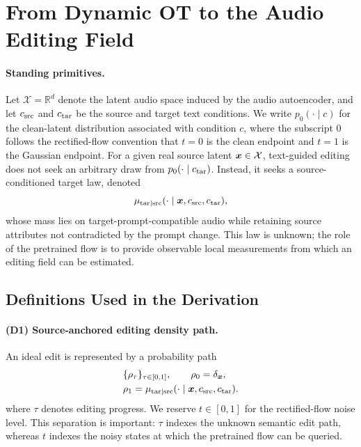 \section{From Dynamic OT to the Audio Editing Field}
\label{app:dynamic_ot_audio}

\paragraph{Standing primitives.}
Let $\mathcal{X}=\mathbb{R}^{d}$ denote the latent audio space induced by the audio autoencoder, and let $c_{\mathrm{src}}$ and $c_{\mathrm{tar}}$ be the source and target text conditions.
We write $p_0(\cdot\mid c)$ for the clean-latent distribution associated with condition $c$, where the subscript $0$ follows the rectified-flow convention that $t=0$ is the clean endpoint and $t=1$ is the Gaussian endpoint.
For a given real source latent $\boldsymbol{x}\in\mathcal{X}$, text-guided editing does not seek an arbitrary draw from $p_0(\cdot\mid c_{\mathrm{tar}})$.
Instead, it seeks a source-conditioned target law, denoted
\begin{equation}
    \label{eq:app_target_law}
    \mu_{\mathrm{tar}|\mathrm{src}}(\cdot\mid \boldsymbol{x},c_{\mathrm{src}},c_{\mathrm{tar}}),
\end{equation}
whose mass lies on target-prompt-compatible audio while retaining source attributes not contradicted by the prompt change.
This law is unknown; the role of the pretrained flow is to provide observable local measurements from which an editing field can be estimated.

\subsection{Definitions Used in the Derivation}

\paragraph{(D1) Source-anchored editing density path.}
An ideal edit is represented by a probability path
\begin{equation}
    \label{eq:app_edit_density_path}
    \begin{aligned}
    &\{\rho_\tau\}_{\tau\in[0,1]},
    \qquad
    \rho_0=\delta_{\boldsymbol{x}},
    \\
    &\rho_1=\mu_{\mathrm{tar}|\mathrm{src}}(\cdot\mid \boldsymbol{x},c_{\mathrm{src}},c_{\mathrm{tar}}).
    \end{aligned}
\end{equation}
where $\tau$ denotes editing progress.
We reserve $t\in[0,1]$ for the rectified-flow noise level.
This separation is important: $\tau$ indexes the unknown semantic edit path, whereas $t$ indexes the noisy states at which the pretrained flow can be queried.

